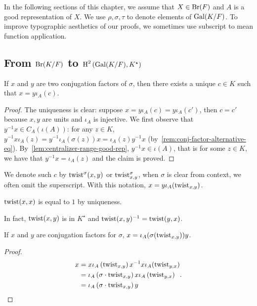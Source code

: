 In the following sections of this chapter, we assume that $X \in\operatorname{Br}(F)$ and $A$ is a good representation of $X$. We use $\rho, \sigma, \tau$ to denote elements of $\operatorname{Gal}(K/F)$. To improve typographic aesthetics of our proofs, we sometimes use subscript to mean function application.


\subsection{From $\operatorname{Br}(K/F)$ to $\operatorname{H}^{2}\left(\operatorname{Gal}(K/F),K^{\star}\right)$}

\begin{lemma}\label{lem:twist-spec1}
  If $x$ and $y$ are two conjugation factors of $\sigma$, then there exists a unique $c \in K$ such that $x = y\iota_{A}(c)$.
  \leanok
\end{lemma}

\begin{proof}
  The uniqueness is clear: suppose $x = y\iota_{A}(c)=y\iota_{A}(c')$, then $c = c'$ because $x, y$ are units and $\iota_{A}$ is injective. We first observe that $y^{-1}x\in C_{A}(\iota(A))$: for any $z \in K$, $y^{-1}x\iota_{A}(z)=y^{-1}\iota_{A}(\sigma(z))x=\iota_{A}(z)y^{-1}x$ (by~\cref{rem:conj-factor-alternative-eq}). By~\cref{lem:centralizer-range-good-rep}, $y^{-1}x\in \iota(A)$, that is for some $z \in K$, we have that $y^{-1}x = \iota_{A}(z)$ and the claim is proved.
\end{proof}

We denote such $c$ by $\operatorname{twist}^{\sigma}(x, y)$ or $\operatorname{twist}^{\sigma}_{x, y}$, when $\sigma$ is clear from context, we often omit the superscript. With this notation, $x = y\iota_{A}(\operatorname{twist}_{x,y})$.

\begin{remark}
  $\operatorname{twist}(x, x)$ is equal to $1$ by uniqueness.
\end{remark}

\begin{remark}
  In fact, $\operatorname{twist}(x, y)$ is in $K^{\star}$ and $\operatorname{twist}(x, y)^{-1}=\operatorname{twist}(y, x)$.
\end{remark}

\begin{lemma}\label{lem:twist-spec2}
  If $x$ and $y$ are conjugation factors for $\sigma$, $x=\iota_{A}(\sigma(\operatorname{twist}_{x, y}))y$.
  \leanok
\end{lemma}
\begin{proof}
  \[
    \begin{aligned}
      x &= x \iota_{A}\left(\operatorname{twist}_{x,y}\right) x^{-1} x \iota_{A}(\operatorname{twist}_{y,x}) \\
        &= \iota_{A}\left(\sigma\cdot\operatorname{twist}_{x,y}\right)x\iota_{A}\left(
          \operatorname{twist}_{y,x}\right)\\
      &=\iota_{A}\left(\sigma\cdot \operatorname{twist}_{x,y}\right)y
    \end{aligned}.
  \]
\end{proof}


